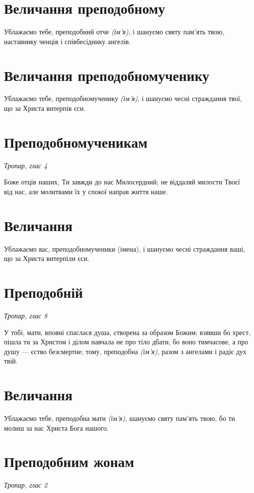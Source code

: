 \documentclass[chapters.tex]{subfiles}
\begin{document}
\section{Величання преподобному}

Ублажаємо тебе, преподобний отче \emph{(ім’я)}, і шануємо святу пам’ять твою, наставнику ченців і співбесіднику ангелів.

\section{Величання преподобномученику}

Ублажаємо тебе, преподобномученику \emph{(ім’я)}, і шануємо чесні страждання твої, що за Христа витерпів єси.

\section{Преподобномученикам}
\emph{Тропар, глас 4}

Боже отців наших, Ти завжди до нас Милосердний; не віддаляй милости Твоєї від нас, але молитвами їх у спокої направ життя наше.

\section{Величання}

Ублажаємо вас, преподобномученики (імена), і шануємо чесні страждання ваші, що за Христа витерпіли єси.

\section{Преподобній}
\emph{Тропар, глас 8}

У тобі, мати, вповні спаслася душа, створена за образом Божим; взявши бо хрест, пішла ти за Христом і ділом навчала не про тіло дбати, бо воно тимчасове, а про душу — єство безсмертне; тому, преподобна \emph{(ім’я)}, разом з ангелами і радіє дух твій.

\section{Величання}

Ублажаємо тебе, преподобна мати \emph{(ім’я)}, шануємо святу пам’ять твою, бо ти молиш за нас Христа Бога нашого.

\section{Преподобним жонам}
\emph{Тропар, глас 2}
\end{document}
